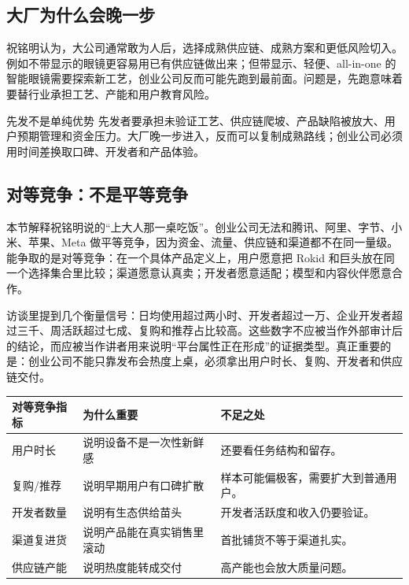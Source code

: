 \documentclass[a4paper]{article}
\begin{document}
\subsection{大厂为什么会晚一步}

祝铭明认为，大公司通常敢为人后，选择成熟供应链、成熟方案和更低风险切入。例如不带显示的眼镜更容易用已有供应链做出来；但带显示、轻便、all-in-one 的智能眼镜需要探索新工艺，创业公司反而可能先跑到最前面。问题是，先跑意味着要替行业承担工艺、产能和用户教育风险。

\begin{warningbox}{先发不是单纯优势}
先发者要承担未验证工艺、供应链爬坡、产品缺陷被放大、用户预期管理和资金压力。大厂晚一步进入，反而可以复制成熟路线；创业公司必须用时间差换取口碑、开发者和产品体验。
\end{warningbox}

\subsection{对等竞争：不是平等竞争}

本节解释祝铭明说的“上大人那一桌吃饭”。创业公司无法和腾讯、阿里、字节、小米、苹果、Meta 做平等竞争，因为资金、流量、供应链和渠道都不在同一量级。能争取的是对等竞争：在一个具体产品定义上，用户愿意把 Rokid 和巨头放在同一个选择集合里比较；渠道愿意认真卖；开发者愿意适配；模型和内容伙伴愿意合作。

访谈里提到几个衡量信号：日均使用超过两小时、开发者超过一万、企业开发者超过三千、周活跃超过七成、复购和推荐占比较高。这些数字不应被当作外部审计后的结论，而应被当作讲者用来说明“平台属性正在形成”的证据类型。真正重要的是：创业公司不能只靠发布会热度上桌，必须拿出用户时长、复购、开发者和供应链交付。

\noindent\begin{tabularx}{\textwidth}{p{}p{}X}
\toprule
对等竞争指标 & 为什么重要 & 不足之处 \\
\midrule
用户时长 & 说明设备不是一次性新鲜感 & 还要看任务结构和留存。 \\
复购/推荐 & 说明早期用户有口碑扩散 & 样本可能偏极客，需要扩大到普通用户。 \\
开发者数量 & 说明有生态供给苗头 & 开发者活跃度和收入仍要验证。 \\
渠道复进货 & 说明产品能在真实销售里滚动 & 首批铺货不等于渠道扎实。 \\
供应链产能 & 说明热度能转成交付 & 高产能也会放大质量问题。 \\
\bottomrule
\end{tabularx}
\end{document}

